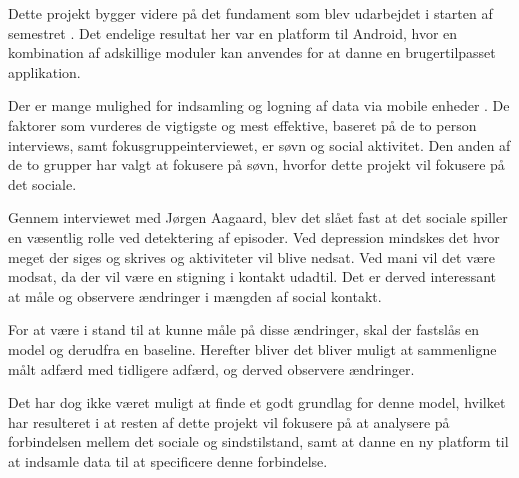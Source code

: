 Dette projekt bygger videre på det fundament som blev udarbejdet i starten af semestret \citefaelles{}.
Det endelige resultat her var en platform til Android, hvor en kombination af adskillige moduler kan anvendes for at danne en brugertilpasset applikation.

Der er mange mulighed  for indsamling og logning af data via mobile enheder .
De faktorer som vurderes de vigtigste og mest effektive, baseret på de to person interviews, samt fokusgruppeinterviewet, er søvn og social aktivitet.
Den anden af de to grupper har valgt at fokusere på søvn, hvorfor dette projekt vil fokusere på det sociale.

Gennem interviewet med Jørgen Aagaard, blev det slået fast at det sociale spiller en væsentlig rolle ved detektering af episoder.
Ved depression mindskes det hvor meget der siges og skrives og aktiviteter vil blive nedsat.
Ved mani vil det være modsat, da der vil være en stigning i kontakt udadtil.
Det er derved interessant at måle og observere ændringer i mængden af social kontakt.

For at være i stand til at kunne måle på disse ændringer, skal der fastslås en model og derudfra en baseline.
Herefter bliver det bliver muligt at sammenligne målt adfærd med tidligere adfærd, og derved observere ændringer.

Det har dog ikke været muligt at finde et godt grundlag for denne model, hvilket har resulteret i at resten af dette projekt vil fokusere på at analysere på forbindelsen mellem det sociale og sindstilstand, samt at danne en ny platform til at indsamle data til at specificere denne forbindelse.